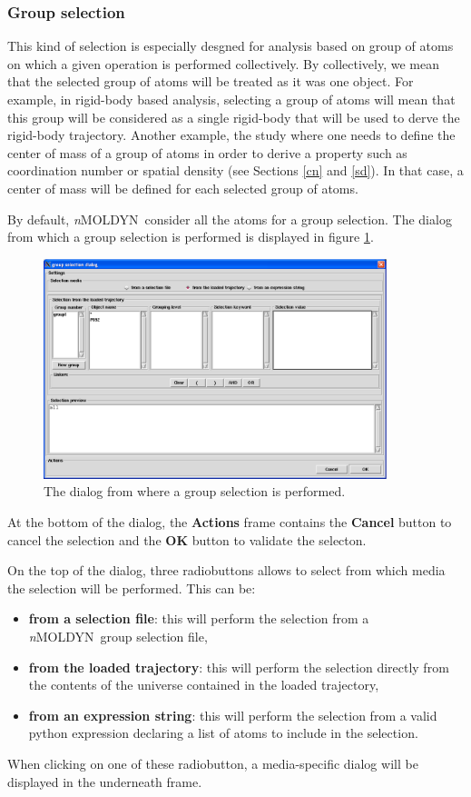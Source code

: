 \documentclass[a4paper,11pt]{report}
\newcommand{\NMOLDYN}{\textit{n}MOLDYN}
\begin{document}
\subsubsection{Group selection}
\label{group_selection}
This kind of selection is especially desgned for analysis based on group of atoms on which a given operation is performed 
collectively. By collectively, we mean that the selected group of atoms will be treated as it was one object. For example, 
in rigid-body based analysis, selecting a group of atoms will mean that this group will be considered as a single rigid-body 
that will be used to derve the rigid-body trajectory. Another example, the study where one needs to define the center of mass 
of a group of atoms in order to derive a property such as coordination number or spatial density (see Sections \ref{cn} and 
\ref{sd}). In that case, a center of mass will be defined for each selected group of atoms.

By default, \NMOLDYN\ consider all the atoms for a group selection. The dialog from which a group selection is performed is 
displayed in figure \ref{fig:group_selection}.
\begin{figure}[h!]
\begin{center}
\includegraphics[width=10cm]{Figures/group_selection.eps}
\end{center}
\caption[The group selection dialog]{The dialog from where a group selection is performed.}
\label{fig:group_selection}
\end{figure}   

At the bottom of the dialog, the \textbf{Actions} frame contains the \textbf{Cancel} button to cancel the selection and 
the \textbf{OK} button to validate the selecton.

On the top of the dialog, three radiobuttons allows to select from which media the selection will be performed. This can be:
\begin{itemize}
\item \textbf{from a selection file}: this will perform the selection from a \NMOLDYN\ group selection file,
\item \textbf{from the loaded trajectory}: this will perform the selection directly from the contents of the universe contained 
in the loaded trajectory,
\item \textbf{from an expression string}: this will perform the selection from a valid python expression declaring a list 
of  atoms to include in the selection.
\end{itemize}
When clicking on one of these radiobutton, a media-specific dialog will be displayed in the underneath frame.
\newpage
\end{document}
